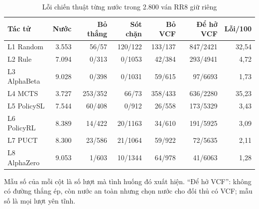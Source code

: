 \begin{table}[H]
  \centering
  \footnotesize
  \caption{Lỗi chiến thuật từng nước trong 2.800 ván RR8 giữ riêng}
  \label{tab:cs-nuoc-loi}
  \begin{tabular}{lrrrrrr}
    \toprule
    Tác tử & Nước & Bỏ thắng & Sót chặn & Bỏ VCF & Để hở VCF & Lỗi/100 \\
    \midrule
    L1 Random & 3.553 & 56/57 & 120/122 & 133/137 & 847/2421 & 32,54 \\
    L2 Rule & 7.094 & 0/313 & 0/1053 & 42/384 & 293/4941 & 4,72 \\
    L3 AlphaBeta & 9.028 & 0/398 & 0/1031 & 59/615 & 97/6693 & 1,73 \\
    L4 MCTS & 3.727 & 253/352 & 66/73 & 358/433 & 636/2280 & 35,23 \\
    L5 PolicySL & 7.544 & 60/408 & 0/912 & 26/558 & 173/5329 & 3,43 \\
    L6 PolicyRL & 8.389 & 14/422 & 20/1163 & 34/610 & 191/5925 & 3,09 \\
    L7 PUCT & 8.300 & 23/586 & 21/1064 & 59/922 & 72/5635 & 2,11 \\
    L8 AlphaZero & 9.053 & 1/603 & 10/1344 & 64/978 & 41/6063 & 1,28 \\
    \bottomrule
  \end{tabular}
  \par\smallskip\parbox{.95\linewidth}{\footnotesize Mẫu số của mỗi cột là số lượt mà tình huống đó xuất hiện. ``Để hở VCF'': không có đường thắng ép, còn nước an toàn nhưng chọn nước cho đối thủ có VCF; mẫu số là mọi lượt yên tĩnh.}
\end{table}
